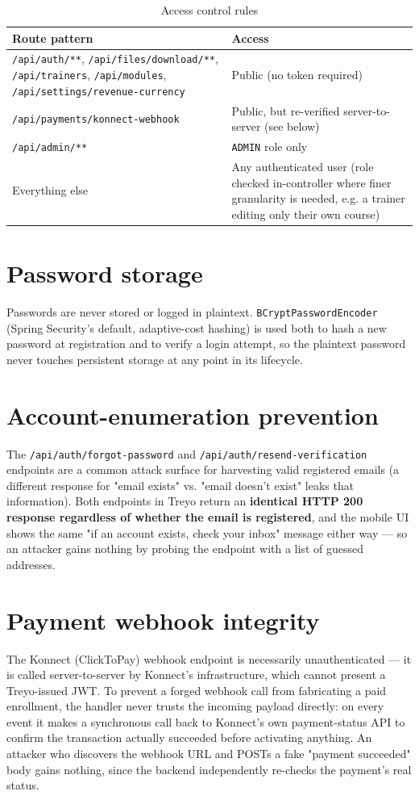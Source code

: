 \documentclass[a4paper,12pt]{report}
\begin{document}
\begin{table}[H]
\centering
\caption{Access control rules}
\begin{tabular}{|P{6cm}|P{5cm}|}
\hline
{}
\textbf{Route pattern} & \textbf{Access} \\
\hline
\texttt{/api/auth/**}, \texttt{/api/files/download/**}, \texttt{/api/trainers}, \texttt{/api/modules}, \texttt{/api/settings/revenue-currency} & Public (no token required) \\
\hline
\texttt{/api/payments/konnect-webhook} & Public, but re-verified server-to-server (see below) \\
\hline
\texttt{/api/admin/**} & \texttt{ADMIN} role only \\
\hline
Everything else & Any authenticated user (role checked in-controller where finer granularity is needed, e.g. a trainer editing only their own course) \\
\hline
\end{tabular}
\end{table}

\section{Password storage}
Passwords are never stored or logged in plaintext. \texttt{BCryptPasswordEncoder}
(Spring Security's default, adaptive-cost hashing) is used both to hash a
new password at registration and to verify a login attempt, so the
plaintext password never touches persistent storage at any point in its
lifecycle.

\section{Account-enumeration prevention}
The \texttt{/api/auth/forgot-password} and
\texttt{/api/auth/resend-verification} endpoints are a common attack
surface for harvesting valid registered emails (a different response for
"email exists" vs. "email doesn't exist" leaks that information). Both
endpoints in Treyo return an \textbf{identical HTTP 200 response
regardless of whether the email is registered}, and the mobile UI shows
the same "if an account exists, check your inbox" message either way ---
so an attacker gains nothing by probing the endpoint with a list of
guessed addresses.

\section{Payment webhook integrity}
The Konnect (ClickToPay) webhook endpoint is necessarily unauthenticated
--- it is called server-to-server by Konnect's infrastructure, which
cannot present a Treyo-issued JWT. To prevent a forged webhook call from
fabricating a paid enrollment, the handler never trusts the incoming
payload directly: on every event it makes a synchronous call back to
Konnect's own payment-status API to confirm the transaction actually
succeeded before activating anything. An attacker who discovers the
webhook URL and POSTs a fake "payment succeeded" body gains nothing, since
the backend independently re-checks the payment's real status.
\end{document}
